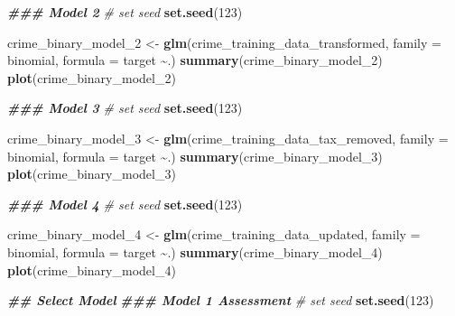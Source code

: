 \documentclass[
]{article}
\newenvironment{Shaded}{\begin{snugshade}}{\end{snugshade}}
\newcommand{\AttributeTok}[1]{\textcolor[rgb]{0.13,0.29,0.53}{#1}}
\newcommand{\CommentTok}[1]{\textcolor[rgb]{0.56,0.35,0.01}{\textit{#1}}}
\newcommand{\DecValTok}[1]{\textcolor[rgb]{0.00,0.00,0.81}{#1}}
\newcommand{\DocumentationTok}[1]{\textcolor[rgb]{0.56,0.35,0.01}{\textbf{\textit{#1}}}}
\newcommand{\FunctionTok}[1]{\textcolor[rgb]{0.13,0.29,0.53}{\textbf{#1}}}
\newcommand{\NormalTok}[1]{#1}
\newcommand{\OtherTok}[1]{\textcolor[rgb]{0.56,0.35,0.01}{#1}}
\newcommand{\SpecialCharTok}[1]{\textcolor[rgb]{0.81,0.36,0.00}{\textbf{#1}}}
\newcommand{\StringTok}[1]{\textcolor[rgb]{0.31,0.60,0.02}{#1}}
\begin{document}
\begin{Shaded}
\begin{Highlighting}[]
\DocumentationTok{\#\#\# Model 2}
\CommentTok{\# set seed}
\FunctionTok{set.seed}\NormalTok{(}\DecValTok{123}\NormalTok{)}

\NormalTok{crime\_binary\_model\_2 }\OtherTok{\textless{}{-}} \FunctionTok{glm}\NormalTok{(crime\_training\_data\_transformed, }\AttributeTok{family =} \StringTok{\textquotesingle{}binomial\textquotesingle{}}\NormalTok{, }\AttributeTok{formula =}\NormalTok{ target }\SpecialCharTok{\textasciitilde{}}\NormalTok{.)}
\FunctionTok{summary}\NormalTok{(crime\_binary\_model\_2)}
\FunctionTok{plot}\NormalTok{(crime\_binary\_model\_2)}

\DocumentationTok{\#\#\# Model 3}
\CommentTok{\# set seed}
\FunctionTok{set.seed}\NormalTok{(}\DecValTok{123}\NormalTok{)}

\NormalTok{crime\_binary\_model\_3 }\OtherTok{\textless{}{-}} \FunctionTok{glm}\NormalTok{(crime\_training\_data\_tax\_removed, }\AttributeTok{family =} \StringTok{\textquotesingle{}binomial\textquotesingle{}}\NormalTok{, }\AttributeTok{formula =}\NormalTok{ target }\SpecialCharTok{\textasciitilde{}}\NormalTok{.)}
\FunctionTok{summary}\NormalTok{(crime\_binary\_model\_3)}
\FunctionTok{plot}\NormalTok{(crime\_binary\_model\_3)}

\DocumentationTok{\#\#\# Model 4}
\CommentTok{\# set seed}
\FunctionTok{set.seed}\NormalTok{(}\DecValTok{123}\NormalTok{)}

\NormalTok{crime\_binary\_model\_4 }\OtherTok{\textless{}{-}} \FunctionTok{glm}\NormalTok{(crime\_training\_data\_updated, }\AttributeTok{family =} \StringTok{\textquotesingle{}binomial\textquotesingle{}}\NormalTok{, }\AttributeTok{formula =}\NormalTok{ target }\SpecialCharTok{\textasciitilde{}}\NormalTok{.)}
\FunctionTok{summary}\NormalTok{(crime\_binary\_model\_4)}
\FunctionTok{plot}\NormalTok{(crime\_binary\_model\_4)}

\DocumentationTok{\#\# Select Model}
\DocumentationTok{\#\#\# Model 1 Assessment}
\CommentTok{\# set seed}
\FunctionTok{set.seed}\NormalTok{(}\DecValTok{123}\NormalTok{)}


\end{Highlighting}
\end{Shaded}
\end{document}
